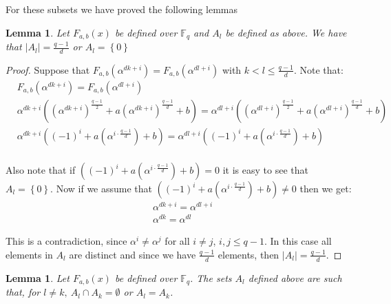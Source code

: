 \documentclass{article}
\newtheorem{lemma}[theorem]{Lemma}
\theoremstyle{definition}
\theoremstyle{remark}
\numberwithin{equation}{section}
\begin{document}
    For these subsets we have proved the following lemmas

    \begin{lemma}\label{tamanos_conjuntos}
      Let $F_{a,b}(x)$ be defined over $\mathbb{F}_{q}$ and $A_l$ be defined as above. We have that $\left\vert A_l \right\vert = \frac{q-1}{d}$ or $A_l = \left\{ 0 \right\}$
    \end{lemma}

    \begin{proof}
      Suppose that $F_{a,b}(\alpha^{dk+i})=F_{a,b}(\alpha^{dl+i})$ with $k<l\leq \frac{q-1}{d}$. Note that:
      \begin{align*}
      &F_{a,b}(\alpha^{dk+i})=F_{a,b}(\alpha^{dl+i}) \\
      &\alpha^{dk+i}((\alpha^{dk+i})^{\frac{q-1}{2}}+a(\alpha^{dk+i})^{\frac{q-1}{d}}+b) = \alpha^{dl+i}((\alpha^{dl+i})^{\frac{q-1}{2}}+a(\alpha^{dl+i})^{\frac{q-1}{d}}+b) \\
      &\alpha^{dk+i}((-1)^{i}+a(\alpha^{i\cdot \frac{q-1}{d}})+b) = \alpha^{dl+i}((-1)^{i}+a(\alpha^{i\cdot \frac{q-1}{d}})+b) \\
      \end{align*}

      Also note that if $((-1)^{i}+a(\alpha^{i\cdot \frac{q-1}{d}})+b) = 0$ it is easy to see that $A_{l} = \left\{0\right\}$. Now if we assume that $((-1)^{i}+a(\alpha^{i\cdot \frac{q-1}{d}})+b) \neq 0$ then we get:
      \begin{align*}
      &\alpha^{dk+i} = \alpha^{dl+i} \\
      &\alpha^{dk} = \alpha^{dl}
      \end{align*}

      This is a contradiction, since $\alpha^{i} \neq \alpha^{j}$ for all $i \neq j$, $i,j \leq q-1$. In this case all elements in $A_{l}$ are distinct and since we have $\frac{q-1}{d}$ elements, then $\left\vert A_{l} \right\vert = \frac{q-1}{d}$.
    \end{proof}

    \begin{lemma}\label{conjuntos_disjuntos}
      Let $F_{a,b}(x)$ be defined over $\mathbb{F}_{q}$. The sets $A_l$ defined  above are such that, for $l \not = k , \ A_l \cap A_k = \emptyset$ or $A_l = A_k$.
    \end{lemma}
\end{document}
